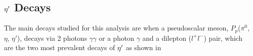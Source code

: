 \subsection{$\eta^{\prime}$ Decays}\label{sec:intro.decays}
The main decays studied for this analysis are when a pseudoscalar meson, $P_p$($\pi^{0}$, $\eta$, $\eta'$), decays via 2 photons $\gamma \gamma$ or a photon $\gamma$ and a dilepton ($l^{+}l^{-}$) pair, which are the two most prevalent decays of $\eta^{\prime}$ as shown in 
%

%
